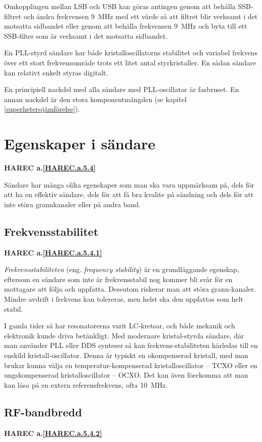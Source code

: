 Omkopplingen mellan LSB och USB kan göras antingen genom att behålla
SSB-filtret och ändra frekvensen 9~MHz med ett värde så att filtret
blir verksamt i det motsatta sidbandet eller genom att behålla
frekvensen 9~MHz och byta till ett SSB-filter som är verksamt i det
motsatta sidbandet.

En PLL-styrd sändare har både kristalloscillatorns stabilitet och variabel
frekvens över ett stort frekvensområde trots ett litet antal styrkristaller.
En sådan sändare kan relativt enkelt styras digitalt.

En principiell nackdel med alla sändare med PLL-oscillator är fasbruset.
En annan nackdel är den stora komponentmängden
(se kapitel \ref{superheterojämförelse}).

\section{Egenskaper i sändare}
\textbf{HAREC
  a.\ref{HAREC.a.5.4}\label{myHAREC.a.5.4}
}

Sändare har många olika egenskaper som man ska vara uppmärksam på, dels för
att ha en effektiv sändare, dels för att få bra kvalite på sändning och dels
för att inte störa grannkanaler eller på andra band.

\subsection{Frekvensstabilitet}
\textbf{HAREC
  a.\ref{HAREC.a.5.4.1}\label{myHAREC.a.5.4.1}
}

\emph{Frekvensstabiliteten} (eng. \emph{frequency stability}) är en
grundläggande egenskap, eftersom en sändare som inte är frekvensstabil nog
kommer bli svår för en mottagare att följa och uppfatta.
Dessutom riskerar man att störa grann-kanaler.
Mindre avdrift i frekvens kan tolereras, men helst ska den uppfattas som
helt stabil.

I gamla tider så har resonatorerna varit LC-kretsar, och både mekanik och
elektronik kunde driva betänkligt.
Med modernare kristal-styrda sändare, där man använder PLL eller DDS
synteser så kan frekvens-stabiliteten härledas till en enskild
kristall-oscillator.
Denna är typiskt en okompenserad kristall, med man brukar kunna välja en
temperatur-kompenserad kristalloscillator -- TCXO eller en ungskompenserad
kristalloscillator -- OCXO.
Det kan även förekomma att man kan låsa på en extern referensfrekvens,
ofta 10~MHz.

\subsection{RF-bandbredd}
\textbf{HAREC
  a.\ref{HAREC.a.5.4.2}\label{myHAREC.a.5.4.2}
}

